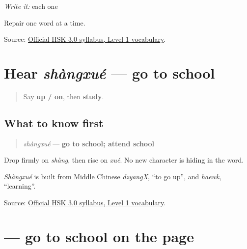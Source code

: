 \emph{Write it:} each one

Repair one word at a time.

\begin{tcolorbox}[breakable,colback=teal!4,colframe=teal!35!black,title={Before you move on}]
Source: \href{https://hsk.cn-bj.ufileos.com/3.0/\%E6\%96\%B0\%E7\%89\%88HSK\%E8\%80\%83\%E8\%AF\%95\%E5\%A4\%A7\%E7\%BA\%B21219.pdf}{Official HSK 3.0 syllabus, Level 1 vocabulary}.
\end{tcolorbox}
\section[shàngxué]{Hear \emph{shàngxué} — go to school}

\label{lesson:ZH-C15-hear-shangxue}



\begin{quote}
Say \textbf{up / on}, then \textbf{study}.
\end{quote}

\subsection*{What to know first}
\begin{quote}
\emph{shàngxué} — \textbf{go to school; attend school}
\end{quote}

Drop firmly on \emph{shàng}, then rise on \emph{xué}. No new character is hiding in the word.

\emph{Shàngxué} is built from Middle Chinese \emph{dzyangX}, \textquotedblleft{}to go up\textquotedblright{}, and \emph{haewk}, \textquotedblleft{}learning\textquotedblright{}.

\begin{tcolorbox}[breakable,colback=teal!4,colframe=teal!35!black,title={Before you move on}]
Source: \href{https://hsk.cn-bj.ufileos.com/3.0/\%E6\%96\%B0\%E7\%89\%88HSK\%E8\%80\%83\%E8\%AF\%95\%E5\%A4\%A7\%E7\%BA\%B21219.pdf}{Official HSK 3.0 syllabus, Level 1 vocabulary}.
\end{tcolorbox}
\section[\texorpdfstring{\zh{上学} (shàngxué)}{上学 (shàngxué)}]{ — go to school on the page}

\label{lesson:ZH-C15-shangxue}




